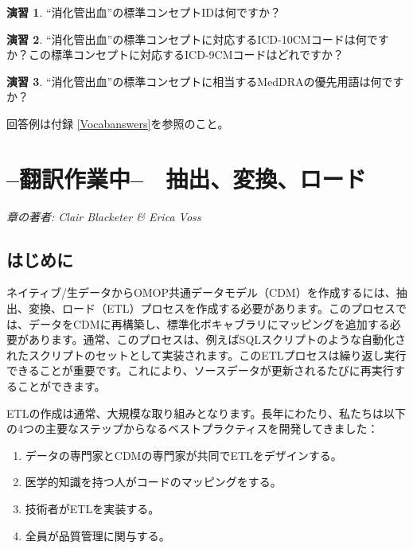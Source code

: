 \documentclass[
  11pt]{book}
\providecommand{\tightlist}{%
  \setlength{\itemsep}{0pt}\setlength{\parskip}{0pt}}
\theoremstyle{definition}
\theoremstyle{definition}
\theoremstyle{definition}
\newtheorem{exercise}{演習}[chapter]
\theoremstyle{definition}
\theoremstyle{remark}
\begin{document}
\begin{exercise}
\protect\hypertarget{exr:exerciseVocab1}{}\label{exr:exerciseVocab1}``消化管出血''の標準コンセプトIDは何ですか？
\end{exercise}

\begin{exercise}
\protect\hypertarget{exr:exerciseVocab2}{}\label{exr:exerciseVocab2}``消化管出血''の標準コンセプトに対応するICD-10CMコードは何ですか？この標準コンセプトに対応するICD-9CMコードはどれですか？
\end{exercise}

\begin{exercise}
\protect\hypertarget{exr:exerciseVocab3}{}\label{exr:exerciseVocab3}``消化管出血''の標準コンセプトに相当するMedDRAの優先用語は何ですか？
\end{exercise}

回答例は付録 \ref{Vocabanswers}を参照のこと。

\chapter{--翻訳作業中--　抽出、変換、ロード}\label{ExtractTransformLoad}

\emph{章の著者: Clair Blacketer \& Erica Voss}

\section{はじめに}\label{ux306fux3058ux3081ux306b}

ネイティブ/生データからOMOP共通データモデル（CDM）を作成するには、抽出、変換、ロード（ETL）プロセスを作成する必要があります。このプロセスでは、データをCDMに再構築し、標準化ボキャブラリにマッピングを追加する必要があります。通常、このプロセスは、例えばSQLスクリプトのような自動化されたスクリプトのセットとして実装されます。このETLプロセスは繰り返し実行できることが重要です。これにより、ソースデータが更新されるたびに再実行することができます。   

ETLの作成は通常、大規模な取り組みとなります。長年にわたり、私たちは以下の4つの主要なステップからなるベストプラクティスを開発してきました：

\begin{enumerate}
\def\labelenumi{\arabic{enumi}.}
\tightlist
\item
  データの専門家とCDMの専門家が共同でETLをデザインする。
\item
  医学的知識を持つ人がコードのマッピングをする。
\item
  技術者がETLを実装する。
\item
  全員が品質管理に関与する。
\end{enumerate}
\end{document}
